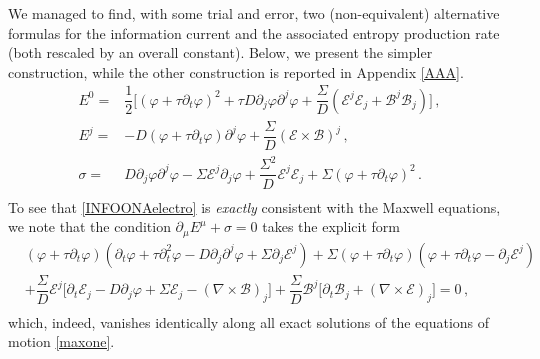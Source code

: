\documentclass[a4paper, amsfonts, amssymb, amsmath, reprint, showkeys, nofootinbib, twoside,notitlepage,onecolumn,preprintnumbers]{revtex4-2}
\theoremstyle{definition}
\theoremstyle{theorem}
\theoremstyle{corollary}
\begin{document}
We managed to find, with some trial and error, two (non-equivalent) alternative formulas for the information current and the associated entropy production rate (both rescaled by an overall constant). Below, we present the simpler construction, while the other construction is reported in Appendix \ref{AAA}.
\begin{equation}\label{INFOONAelectro}
\begin{split}
E^0 ={}& \dfrac{1}{2} \bigg[ (\varphi +  \tau  \partial_t \varphi)^2 + \tau D \partial_j \varphi \partial^j \varphi +\dfrac{\Sigma}{D} (\mathcal{E}^j \mathcal{E}_j + \mathcal{B}^j \mathcal{B}_j) \bigg] \, ,\\
E^j ={}& -D(\varphi + \tau \partial_t \varphi)\partial^j \varphi +\dfrac{\Sigma}{D} (\mathcal{E} \times \mathcal{B})^j \, ,\\
\sigma ={}&  D \partial_j \varphi \partial^j \varphi-\Sigma \mathcal{E}^j \partial_j \varphi+\dfrac{\Sigma^2}{D}\mathcal{E}^j \mathcal{E}_j+ \Sigma (\varphi+\tau \partial_t \varphi)^2 \, . \\
\end{split}
\end{equation}
To see that \eqref{INFOONAelectro} is \textit{exactly} consistent with the Maxwell equations, we note that the condition $\partial_\mu E^\mu +\sigma=0$ takes the explicit form
\begin{equation}
\begin{split}
& (\varphi+\tau \partial_t \varphi)(\partial_t \varphi +\tau \partial^2_t \varphi - D \partial_j \partial^j \varphi + \Sigma \partial_j \mathcal{E}^j) + \Sigma (\varphi +\tau \partial_t \varphi)(\varphi +\tau \partial_t \varphi-\partial_j \mathcal{E}^j)\\
& +\dfrac{\Sigma}{D} \mathcal{E}^j \big[ \partial_t \mathcal{E}_j-D\partial_j \varphi+\Sigma \mathcal{E}_j-(\nabla \times \mathcal{B})_j \big]+\dfrac{\Sigma}{D}\mathcal{B}^j \big[ \partial_t \mathcal{B}_j +(\nabla \times \mathcal{E})_j \big]=0 \, , \\
\end{split}
\end{equation}
which, indeed, vanishes identically along all exact solutions of the equations of motion \eqref{maxone}.
\end{document}
